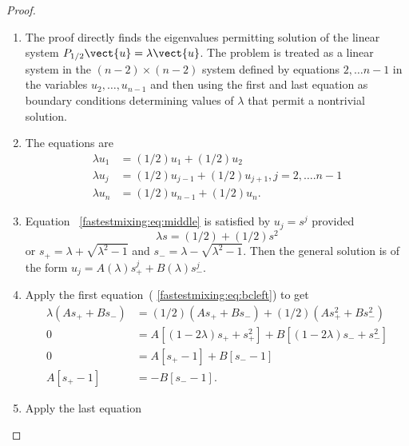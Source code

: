 \documentclass[12pt]{article}
\begin{document}
\begin{proof}
    \begin{enumerate}
        \item
            The proof directly finds the eigenvalues permitting solution
            of the linear system \( P_{1/2} \vect{u} = \lambda \vect{u} \).
            The problem is treated as a linear system in the \( (n-2)
            \times (n-2) \) system defined by equations \( 2, \dots n-1 \)
            in the variables \( u_2, \dots, u_{n-1} \) and then using
            the first and last equation as boundary conditions
            determining values of \( \lambda \) that permit a nontrivial
            solution.
        \item
            The equations are
            \begin{align}
                \lambda u_1 &= (1/2) u_1 + (1/2) u_2%
                \label{fastestmixing:eq:bcleft} \\
                \lambda u_j &= (1/2) u_{j-1} + (1/2) u_{j+1}, j=2,\dots.n-1%
                \label{fastestmixing:eq:middle} \\
                \lambda u_n &= (1/2) u_{n-1} + (1/2) u_n.%
                \label{fastestmixing:eq:bcright}
            \end{align}
        \item
            Equation~%
            \eqref{fastestmixing:eq:middle} is satisfied by \( u_j = s^j
            \) provided
            \[
                \lambda s = (1/2) + (1/2) s^2
            \] or \( s_{+} = \lambda + \sqrt{\lambda^2 - 1} \) and \( s_
            {-} = \lambda - \sqrt{\lambda^2 - 1} \).  Then the general
            solution is of the form \( u_j = A(\lambda) s_{+}^j + B(\lambda)
            s_{-}^j \).
        \item
            Apply the first equation~(%
            \eqref{fastestmixing:eq:bcleft}) to get
            \begin{align*}
                \lambda (A s_{+} + B s_{-} ) &= (1/2)(A s_{+} + B s_{-})
                + (1/2) (A s_{+}^2 + B s_{-}^2) \\
                0 &= A[(1-2\lambda)s_{+} + s_{+}^2] + B[(1-2\lambda)s_{-}
                + s_{-}^2] \\
                0 &= A[s_{+} - 1] + B[s_{-} -1] \\
                A[s_{+} - 1] &= -B[s_{-} -1].
            \end{align*}
        \item
            Apply the last equation~%

\end{enumerate}
\end{proof}
\end{document}

